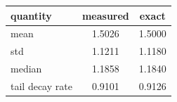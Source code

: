 \begin{tabular}{lcc}
\toprule
quantity & measured & exact \\
\midrule
mean & 1.5026 & 1.5000 \\
std & 1.1211 & 1.1180 \\
median & 1.1858 & 1.1840 \\
tail decay rate & 0.9101 & 0.9126 \\
\bottomrule
\end{tabular}
